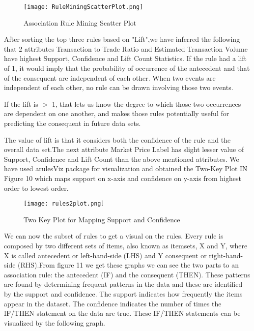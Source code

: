 \documentclass{article}
\begin{document}
\begin{figure}[h]
    \centering
    \texttt{[image: RuleMiningScatterPlot.png]}
    \caption{ Association Rule Mining Scatter Plot }
    \label{fig:my_label}
\end{figure}


After sorting the top three rules based on "Lift",we have inferred the following that 2 attributes Transaction to Trade Ratio and  Estimated Transaction Volume have highest Support, Confidence and Lift Count Statistics. If the rule had a lift of 1, it would imply that the probability of occurrence of the antecedent and that of the consequent are independent of each other. When two events are independent of each other, no rule can be drawn involving those two events.\newline

If the lift is $>$ 1, that lets us know the degree to which those two occurrences are dependent on one another, and makes those rules potentially useful for predicting the consequent in future data sets. \newline

The value of lift is that it considers both the confidence of the rule and the overall data set.The next attribute Market Price Label has slight lesser value of Support, Confidence and Lift Count than the above mentioned attributes. We have used arulesViz package for visualization and obtained the Two-Key Plot IN Figure 10 which maps support on x-axis and confidence on y-axis from highest order to lowest order. 

\begin{figure}[h]
    \centering
    \texttt{[image: rules2plot.png]}
    \caption{ Two Key Plot for Mapping Support and Confidence}
    \label{fig:my_label}
\end{figure}

 We can now the subset of rules to get a visual on the rules. Every rule is composed by two different sets of items, also known as itemsets,  X and Y, where X is called antecedent or left-hand-side (LHS) and Y consequent or right-hand-side (RHS).From figure 11 we get these graphs we can see the two parts to an association rule: the antecedent (IF) and the consequent (THEN).  These patterns are found by determining frequent patterns in the data and these are identified by the support and confidence.  The support indicates how frequently the items appear in the dataset. The confidence indicates the number of times the IF/THEN statement on the data are true. These IF/THEN statements can be visualized by the following graph. \newline
 
\end{document}
